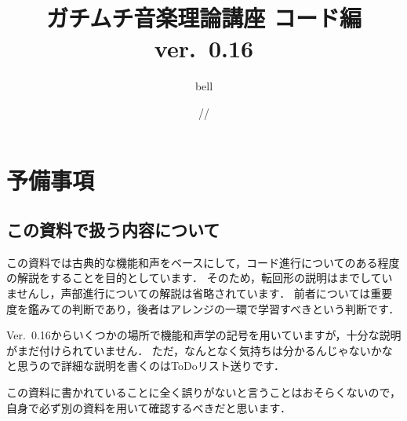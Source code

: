 \documentclass[dvipdfmx,uplatex,b5paper,openany,jbase=12Q,nomag*,textwidth-limit=44%
               ]{gachimuchi}[2020/05/05]
\title{ガチムチ音楽理論講座 コード編 ver.~0.16}
\author{bell}
\date{\the\year/\the\month/\the\day}
\begin{document}
\frontmatter
\maketitle
{}\tableofcontents
\clearpage%
\chapter{予備事項}%
\section{この資料で扱う内容について}%
この資料では古典的な機能和声をベースにして，コード進行についてのある程度の解説をすることを目的としています．
そのため，転回形の説明はまでしていませんし，声部進行についての解説は省略されています．
前者については重要度を鑑みての判断であり，後者はアレンジの一環で学習すべきという判断です．

Ver.~0.16からいくつかの場所で機能和声学の記号を用いていますが，十分な説明がまだ付けられていません．
ただ，なんとなく気持ちは分かるんじゃないかなと思うので詳細な説明を書くのはToDoリスト送りです．

この資料に書かれていることに全く誤りがないと言うことはおそらくないので，
自身で必ず別の資料を用いて確認するべきだと思います．

\end{document}
